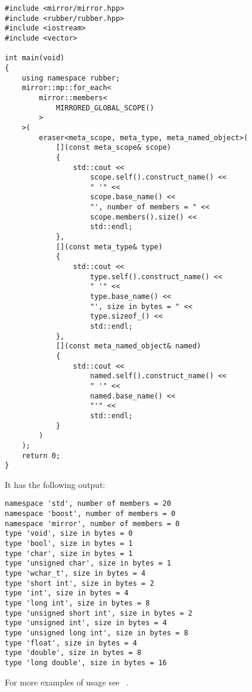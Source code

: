 \begin{lstlisting}
#include <mirror/mirror.hpp>
#include <rubber/rubber.hpp>
#include <iostream>
#include <vector>

int main(void)
{
    using namespace rubber;
    mirror::mp::for_each<
        mirror::members<
            MIRRORED_GLOBAL_SCOPE()
        >
    >(
        eraser<meta_scope, meta_type, meta_named_object>(
            [](const meta_scope& scope)
            {
                std::cout <<
                    scope.self().construct_name() <<
                    " '" <<
                    scope.base_name() <<
                    "', number of members = " <<
                    scope.members().size() <<
                    std::endl;
            },
            [](const meta_type& type)
            {
                std::cout <<
                    type.self().construct_name() <<
                    " '" <<
                    type.base_name() <<
                    "', size in bytes = " <<
                    type.sizeof_() <<
                    std::endl;
            },
            [](const meta_named_object& named)
            {
                std::cout <<
                    named.self().construct_name() <<
                    " '" <<
                    named.base_name() <<
                    "'" <<
                    std::endl;
            }
        )
    );
    return 0;
}
\end{lstlisting}

It has the following output:

\begin{verbatim}
namespace 'std', number of members = 20
namespace 'boost', number of members = 0
namespace 'mirror', number of members = 0
type 'void', size in bytes = 0
type 'bool', size in bytes = 1
type 'char', size in bytes = 1
type 'unsigned char', size in bytes = 1
type 'wchar_t', size in bytes = 4
type 'short int', size in bytes = 2
type 'int', size in bytes = 4
type 'long int', size in bytes = 8
type 'unsigned short int', size in bytes = 2
type 'unsigned int', size in bytes = 4
type 'unsigned long int', size in bytes = 8
type 'float', size in bytes = 4
type 'double', size in bytes = 8
type 'long double', size in bytes = 16
\end{verbatim}

For more examples of usage see ~\cite{mirror-doc-rubber-examples}.
